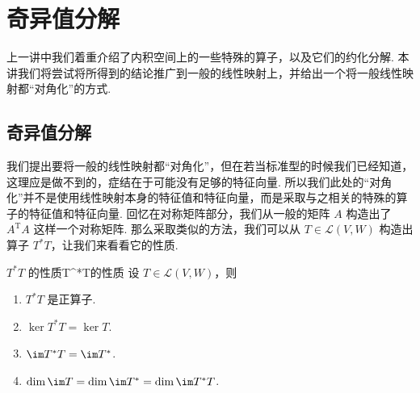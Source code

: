 \chapter{奇异值分解}

上一讲中我们着重介绍了内积空间上的一些特殊的算子，以及它们的约化分解. 本讲我们将尝试将所得到的结论推广到一般的线性映射上，并给出一个将一般线性映射都“对角化”的方式.

\section{奇异值分解}

我们提出要将一般的线性映射都“对角化”，但在若当标准型的时候我们已经知道，这理应是做不到的，症结在于可能没有足够的特征向量. 所以我们此处的“对角化”并不是使用线性映射本身的特征值和特征向量，而是采取与之相关的特殊的算子的特征值和特征向量. 回忆在对称矩阵部分，我们从一般的矩阵 $ A $ 构造出了 $ A^{\mathrm{T}}A $ 这样一个对称矩阵. 那么采取类似的方法，我们可以从 $ T \in \mathcal{L}(V, W) $ 构造出算子 $ T^*T $，让我们来看看它的性质.

\begin{theorem}{$ T^*T $ 的性质}{T^*T的性质}
    设 $ T \in \mathcal{L}(V, W) $，则
    \begin{enumerate}
        \item $ T^*T $ 是正算子.

        \item $ \ker T^*T = \ker T $.

        \item $ \im T^*T = \im T^* $.

        \item $ \dim \im T = \dim \im T^* = \dim \im T^*T $.
    \end{enumerate}
\end{theorem}

